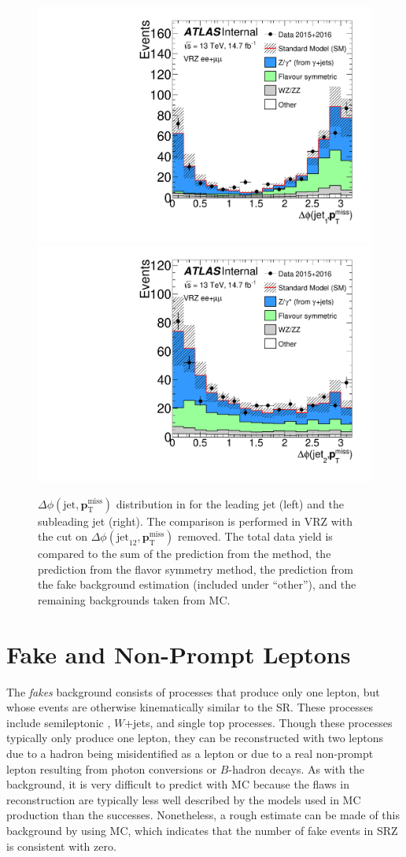 \begin{centering}
\begin{figure}[!hbt]
\myfloatalign
\includegraphics[width=.45\linewidth]{figures/photons/METJetLeading_azmet_ee+mm_onz_VR.pdf}
\includegraphics[width=.45\linewidth]{figures/photons/METJetSecond_azmet_ee+mm_onz_VR.pdf}
\caption{ $\Delta\phi(\text{jet},{\boldsymbol p}_{\mathrm{T}}^\mathrm{miss})$ distribution in for the leading jet (left) and the subleading jet (right). The comparison is performed in VRZ with the cut on $\Delta\phi(\text{jet}_{12},{\boldsymbol p}_{\mathrm{T}}^\mathrm{miss})$ removed.  The total data yield is compared to the sum of the prediction from the \gjets method, the prediction from the flavor symmetry method, the prediction from the fake background estimation (included under ``other''), and the remaining backgrounds taken from \ac{MC}.}
\label{fig:photon_dphi}
\end{figure}
\end{centering}


\section{Fake and Non-Prompt Leptons}
\label{sec:bg-fake}

The \textit{fakes} background consists of processes that produce only one lepton, but whose events are otherwise kinematically similar to the \ac{SR}. These processes include semileptonic \ttbar, $W$+jets, and single top processes. Though these processes typically only produce one lepton, they can be reconstructed with two leptons due to a hadron being misidentified as a lepton or due to a real non-prompt lepton resulting from photon conversions or $B$-hadron decays. As with the \dyjets background, it is very difficult to predict with \ac{MC} because the flaws in reconstruction are typically less well described by the models used in \ac{MC} production than the successes. Nonetheless, a rough estimate can be made of this background by using \ac{MC}, which indicates that the number of fake events in SRZ is consistent with zero. 

